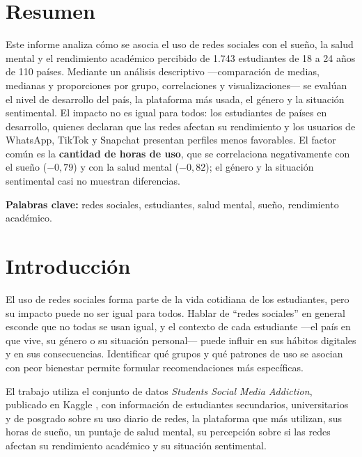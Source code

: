 \documentclass[10pt,a4paper]{article}
\begin{document}

\section*{Resumen}

Este informe analiza cómo se asocia el uso de redes sociales con el sueño, la salud mental y el rendimiento
académico percibido de 1.743 estudiantes de 18 a 24 años de 110 países. Mediante un análisis descriptivo
—comparación de medias, medianas y proporciones por grupo, correlaciones y visualizaciones— se evalúan el
nivel de desarrollo del país, la plataforma más usada, el género y la situación sentimental. El impacto no es
igual para todos: los estudiantes de países en desarrollo, quienes declaran que las redes afectan su
rendimiento y los usuarios de WhatsApp, TikTok y Snapchat presentan perfiles menos favorables. El factor
común es la \textbf{cantidad de horas de uso}, que se correlaciona negativamente con el sueño ($-0{,}79$) y
con la salud mental ($-0{,}82$); el género y la situación sentimental casi no muestran diferencias.

\noindent\textbf{Palabras clave:} redes sociales, estudiantes, salud mental, sueño, rendimiento académico.

\section{Introducción}

El uso de redes sociales forma parte de la vida cotidiana de los estudiantes, pero su impacto puede no ser
igual para todos. Hablar de “redes sociales” en general esconde que no todas se usan igual, y el contexto de
cada estudiante —el país en que vive, su género o su situación personal— puede influir en sus hábitos
digitales y en sus consecuencias. Identificar qué grupos y qué patrones de uso se asocian con peor
bienestar permite formular recomendaciones más específicas.

El trabajo utiliza el conjunto de datos \textit{Students Social Media Addiction}, publicado en Kaggle
\cite{kaggle}, con información de estudiantes secundarios, universitarios y de posgrado sobre su uso diario
de redes, la plataforma que más utilizan, sus horas de sueño, un puntaje de salud mental, su percepción
sobre si las redes afectan su rendimiento académico y su situación sentimental.
\end{document}
